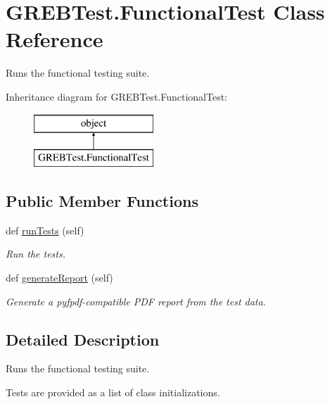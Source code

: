 \hypertarget{class_g_r_e_b_test_1_1_functional_test}{}\section{G\+R\+E\+B\+Test.\+Functional\+Test Class Reference}
\label{class_g_r_e_b_test_1_1_functional_test}


Runs the functional testing suite.  


Inheritance diagram for G\+R\+E\+B\+Test.\+Functional\+Test\+:\begin{figure}[H]
\begin{center}
\leavevmode
\includegraphics[height=2.000000cm]{class_g_r_e_b_test_1_1_functional_test}
\end{center}
\end{figure}
\subsection*{Public Member Functions}
\begin{DoxyCompactItemize}
\item 
def \hyperlink{class_g_r_e_b_test_1_1_functional_test_abc3c4c6a53cd099fde61418e5738acc9}{run\+Tests} (self)
\begin{DoxyCompactList}\small\item\em Run the tests. \end{DoxyCompactList}\item 
def \hyperlink{class_g_r_e_b_test_1_1_functional_test_ac0904992a4e2a98a5ec318bdc3656520}{generate\+Report} (self)
\begin{DoxyCompactList}\small\item\em Generate a pyfpdf-\/compatible P\+DF report from the test data. \end{DoxyCompactList}\end{DoxyCompactItemize}


\subsection{Detailed Description}
Runs the functional testing suite. 

Tests are provided as a list of class initializations. 

